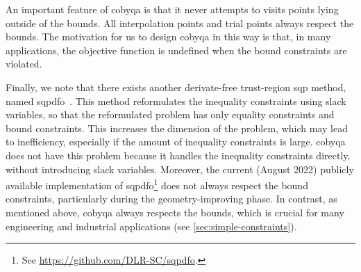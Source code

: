 An important feature of \gls{cobyqa} is that it never attempts to visits points lying outside of the bounds.
All interpolation points and trial points always respect the bounds.
The motivation for us to design \gls{cobyqa} in this way is that, in many applications, the objective function is undefined when the bound constraints are violated.

Finally, we note that there exists another derivate-free trust-region \gls{sqp} method, named \gls{sqpdfo}~\cite{Troltzsch_2016,Gratton_Toint_Troltzsch_2011,Troltzsch_Ilic_Siggel_2021}.
This method reformulates the inequality constraints using slack variables, so that the reformulated problem has only equality constraints and bound constraints.
This increases the dimension of the problem, which may lead to inefficiency, especially if the amount of inequality constraints is large.
\Gls{cobyqa} does not have this problem because it handles the inequality constraints directly, without introducing slack variables.
Moreover, the current (August 2022) publicly available implementation of \gls{sqpdfo}\footnote{See \url{https://github.com/DLR-SC/sqpdfo}.} does not always respect the bound constraints, particularly during the geometry-improving phase.
In contrast, as mentioned above, \gls{cobyqa} always respects the bounds, which is crucial for many engineering and industrial applications (see \cref{sec:simple-constraints}).
